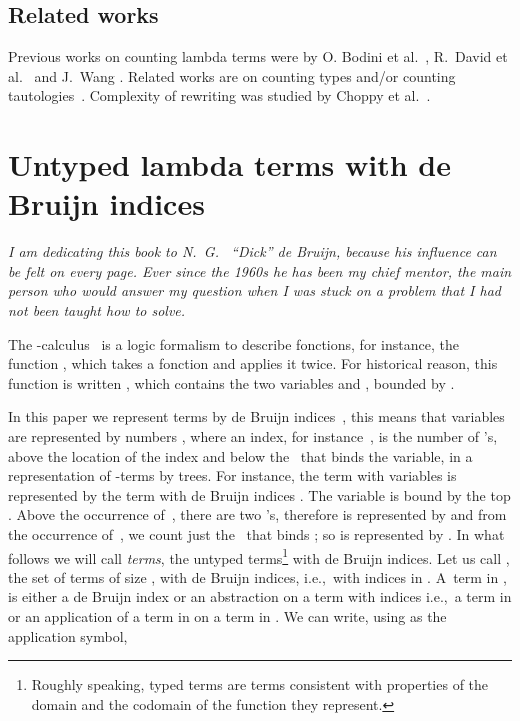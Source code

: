 \documentclass[preprint,authoryear]{elsarticle}
\newcommand{\ie}{i.e.,~}
\begin{document}
\subsection*{Related works}

Previous works on counting lambda terms were by O. Bodini et
al.~\cite{bodini11:_lambd_bound_unary_heigh}, R.~David et
al.~\cite{DBLP:journals/corr/abs-0903-5505} and J.~Wang \cite{Wang05generatingrandom}.
Related works are on counting types and/or counting
tautologies~\cite{DBLP:journals/tcs/Zaionc06,DBLP:conf/csl/FournierGGZ07,DBLP:journals/aml/DavidZ09,DBLP:journals/mlq/FournierGGZ10}. Complexity of rewriting was studied by Choppy et
al.~\cite{ChristineChoppyKS-TCS89}.


\section{Untyped lambda terms with de Bruijn indices}
\label{sec:lambda-terms-with}

\hfill\parbox{10cm}{\it I am dedicating this book to N.~G.~ ``Dick'' de Bruijn, because his
  influence can be felt on every page. Ever since the 1960s he has been my chief mentor,
  the main person who would answer my question when I was stuck on a problem that I had not
  been taught how to solve.
}

\medskip

\medskip

The -calculus~\cite{HBarendregt84} is a logic formalism to describe fonctions, for
instance, the function , which takes a fonction  and
applies it twice.  For historical reason, this function is written , which contains the two variables  and , bounded by .

In this paper we represent terms by de Bruijn indices~\cite{NGDeBruijn108}, this means that
variables are represented by numbers , where an
index, for instance~, is the number of 's, above the location of the index and
below the~ that binds the variable, in a representation of -terms by trees.  For
instance, the term with variables  is represented by the term with de
Bruijn indices . The variable  is bound by the top .  Above
the occurrence of~, there are two 's, therefore  is represented by  and
from the occurrence of~, we count just the~ that binds ; so  is represented
by .  In what follows we will call \emph{terms}, the untyped
terms\footnote{Roughly speaking, typed terms are terms consistent with properties of the domain and
  the codomain of the function they represent.} with de Bruijn
indices.  Let us call , the set of terms of size , with  de Bruijn
indices, \ie with indices in .
A~term in , is either a de Bruijn index or an abstraction on a term with 
indices \ie a term in  or an application of a term in  on a term in
.  We can write, using  as the application symbol,
\end{document}
